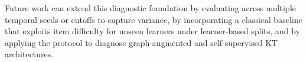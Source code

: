 Future work can extend this diagnostic foundation by evaluating across multiple temporal seeds or cutoffs to capture variance, by incorporating a classical baseline that exploits item difficulty for unseen learners under learner-based splits, and by applying the protocol to diagnose graph-augmented and self-supervised KT architectures.

